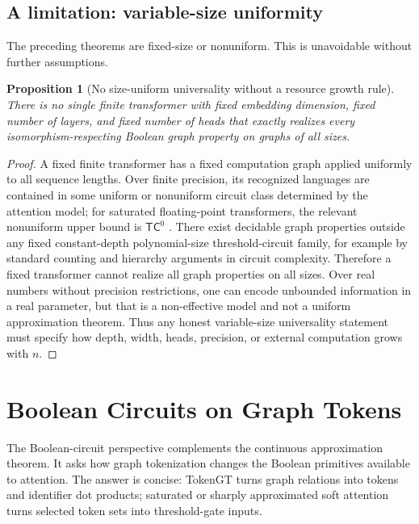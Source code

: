 \documentclass[11pt]{article}
\newtheorem{proposition}[theorem]{Proposition}
\begin{document}
\subsection{A limitation: variable-size uniformity}

The preceding theorems are fixed-size or nonuniform.  This is unavoidable without further assumptions.

\begin{proposition}[No size-uniform universality without a resource growth rule]
\label{prop:no-uniform}
There is no single finite transformer with fixed embedding dimension, fixed number of layers, and fixed number of heads that exactly realizes every isomorphism-respecting Boolean graph property on graphs of all sizes.
\end{proposition}

\begin{proof}
A fixed finite transformer has a fixed computation graph applied uniformly to all sequence lengths.  Over finite precision, its recognized languages are contained in some uniform or nonuniform circuit class determined by the attention model; for saturated floating-point transformers, the relevant nonuniform upper bound is $\mathsf{TC}^0$ \cite{merrill2022saturated}.  There exist decidable graph properties outside any fixed constant-depth polynomial-size threshold-circuit family, for example by standard counting and hierarchy arguments in circuit complexity.  Therefore a fixed transformer cannot realize all graph properties on all sizes.  Over real numbers without precision restrictions, one can encode unbounded information in a real parameter, but that is a non-effective model and not a uniform approximation theorem.  Thus any honest variable-size universality statement must specify how depth, width, heads, precision, or external computation grows with $n$.
\end{proof}

\section{Boolean Circuits on Graph Tokens}
\label{sec:circuits}

The Boolean-circuit perspective complements the continuous approximation theorem.  It asks how graph tokenization changes the Boolean primitives available to attention.  The answer is concise: TokenGT turns graph relations into tokens and identifier dot products; saturated or sharply approximated soft attention turns selected token sets into threshold-gate inputs.
\end{document}
